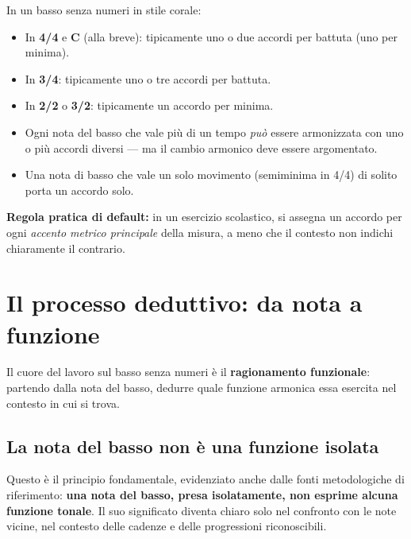 \begin{regola}
	\label{reg:ritmo_armonico_battuta}
	In un basso senza numeri in stile corale:
	\begin{itemize}
		\item In \textbf{4/4} e \textbf{C} (alla breve): tipicamente uno o due accordi per battuta (uno per minima).
		\item In \textbf{3/4}: tipicamente uno o tre accordi per battuta.
		\item In \textbf{2/2} o \textbf{3/2}: tipicamente un accordo per minima.
		\item Ogni nota del basso che vale più di un tempo \textit{può} essere armonizzata con uno o più accordi diversi --- ma il cambio armonico deve essere argomentato.
		\item Una nota di basso che vale un solo movimento (semiminima in 4/4) di solito porta un accordo solo.
	\end{itemize}
	\textbf{Regola pratica di default:} in un esercizio scolastico, si assegna un accordo per ogni \textit{accento metrico principale} della misura, a meno che il contesto non indichi chiaramente il contrario.
\end{regola}

\section{Il processo deduttivo: da nota a funzione}
\label{sec:processo_deduttivo}

Il cuore del lavoro sul basso senza numeri è il \textbf{ragionamento funzionale}: partendo dalla nota del basso, dedurre quale funzione armonica essa esercita nel contesto in cui si trova.

\subsection{La nota del basso non è una funzione isolata}

Questo è il principio fondamentale, evidenziato anche dalle fonti metodologiche di riferimento: \textbf{una nota del basso, presa isolatamente, non esprime alcuna funzione tonale}. Il suo significato diventa chiaro solo nel confronto con le note vicine, nel contesto delle cadenze e delle progressioni riconoscibili.

